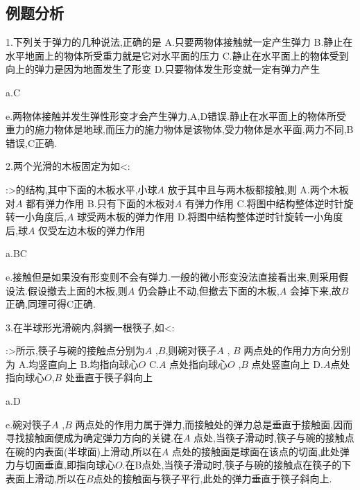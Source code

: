 \subsection{例题分析}
 \begin{selection}
  1.下列关于弹力的几种说法,正确的是
  A.只要两物体接触就一定产生弹力
  B.静止在水平地面上的物体所受重力就是它对水平面的压力
  C.静止在水平面上的物体受到向上的弹力是因为地面发生了形变
  D.只要物体发生形变就一定有弹力产生

  a.C

  e.两物体接触并发生弹性形变才会产生弹力,A,D错误.静止在水平面上的物体所受重力的施力物体是地球,而压力的施力物体是该物体,受力物体是水平面,两力不同,B错误,C正确.

  2.两个光滑的木板固定为如<:
  :>的结构,其中下面的木板水平,小球$A$ 放于其中且与两木板都接触,则
  A.两个木板对$A$ 都有弹力作用
  B.只有下面的木板对$A$ 有弹力作用
  C.将图中结构整体逆时针旋转一小角度后,$A$ 球受两木板的弹力作用
  D.将图中结构整体逆时针旋转一小角度后,球$A$ 仅受左边木板的弹力作用

  a.BC

  e.接触但是如果没有形变则不会有弹力.一般的微小形变没法直接看出来,则采用假设法.假设撤去上面的木板,则$A$ 仍会静止不动,但撤去下面的木板,$A$ 会掉下来,故$B$ 正确,同理可得C正确.

  3.在半球形光滑碗内,斜搁一根筷子,如<:
  :>所示,筷子与碗的接触点分别为$A$ ,$B$,则碗对筷子$A$ , $B$ 两点处的作用力方向分别为
  A.均竖直向上
  B.均指向球心$O$
  C.$A$ 点处指向球心$O$ ,$B$ 点处竖直向上
  D.$A$点处指向球心$O$,$B$ 处垂直于筷子斜向上

  a.D

  e.碗对筷子$A$ ,$B$ 两点处的作用力属于弹力,而接触处的弹力总是垂直于接触面,因而寻找接触面便成为确定弹力方向的关键.在$A$ 点处,当筷子滑动时,筷子与碗的接触点在碗的内表面(半球面)上滑动,所以在$A$ 点处的接触面是球面在该点的切面,此处弹力与切面垂直,即指向球心$O$.在B点处,当筷子滑动时,筷子与碗的接触点在筷子的下表面上滑动,所以在$B$点处的接触面与筷子平行,此处的弹力垂直于筷子斜向上.

 \end{selection}
